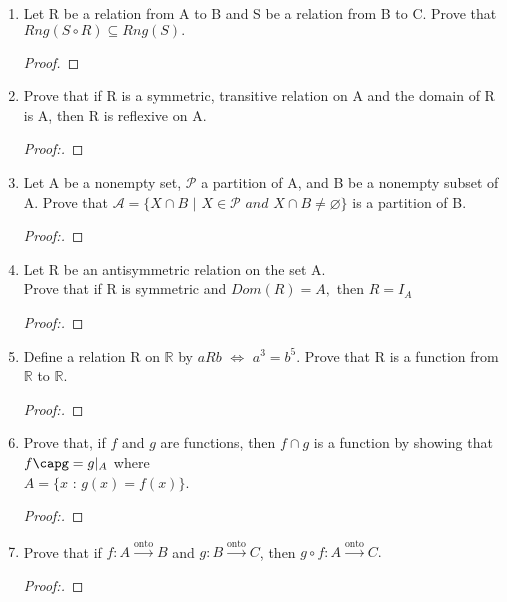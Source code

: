 \documentclass[11pt]{article}
\begin{document}
\begin{enumerate}
    \item Let R be a relation from A to B and S be a relation from B to C. \newline
    Prove that $Rng(S\circ R) \subseteq Rng(S).$
        \begin{proof}
        \end{proof}
        
    \item Prove that if R is a symmetric, transitive relation on A and the domain of R is A, then R is reflexive on A. 
     \begin{proof}[Proof:\nopunct]
        \end{proof}
        
    \item Let A be a nonempty set, $\mathscr{P}$ a partition of A, and B be a nonempty subset of A. \newline Prove that $\mathscr{A}=\{X \cap B$ $|$ $X \in \mathscr{P}$ $and$ $X \cap B \neq \varnothing \}$ is a partition of B.
        \begin{proof}[Proof:\nopunct]
        \end{proof}
        
    \item Let R be an antisymmetric relation on the set A. 
    \\ Prove that if R is symmetric and $Dom(R) = A,$ then $R=I_A$
       \begin{proof}[Proof:\nopunct]
        \end{proof}
        
    \item Define a relation R on $\mathbb{R}$ by $aRb$ $\iff$ $a^3=b^5$. Prove that R is a function from $\mathbb{R}$ to $\mathbb{R}.$
       \begin{proof}[Proof:\nopunct]
        \end{proof}
        
    \item Prove that, if $f$ and $g$ are functions, then $f \cap g$ is a function by showing that $f\capg = g|_{A}$ where \\ $A = \{x$ : $g(x) = f(x) \}.$
       \begin{proof}[Proof:\nopunct]
        \end{proof}
        
    \item Prove that if $f:A \xrightarrow{\text{onto}} B$ and $g:B\xrightarrow{\text{onto}} C$, then $g\circ f:A \xrightarrow{\text{onto}} C.$
        \begin{proof}[Proof:\nopunct]
        \end{proof}
        

\end{enumerate}
\end{document}
